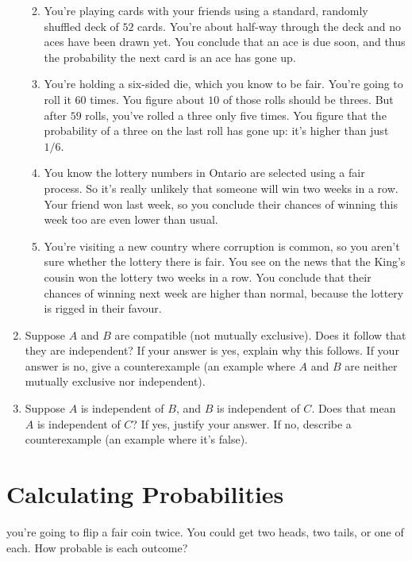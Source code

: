 \documentclass[justified]{tufte-book}
\theoremstyle{definition}
\theoremstyle{definition}
\theoremstyle{definition}
\theoremstyle{definition}
\theoremstyle{remark}
\begin{document}
\begin{enumerate}
  \begin{enumerate}
  \def\labelenumii{\alph{enumii}.}
  \item
    You're playing cards with your friends using a standard, randomly shuffled deck of \(52\) cards. You're about half-way through the deck and no aces have been drawn yet. You conclude that an ace is due soon, and thus the probability the next card is an ace has gone up.
  \item
    You're holding a six-sided die, which you know to be fair. You're going to roll it \(60\) times. You figure about \(10\) of those rolls should be threes. But after \(59\) rolls, you've rolled a three only five times. You figure that the probability of a three on the last roll has gone up: it's higher than just \(1/6\).
  \item
    You know the lottery numbers in Ontario are selected using a fair process. So it's really unlikely that someone will win two weeks in a row. Your friend won last week, so you conclude their chances of winning this week too are even lower than usual.
  \item
    You're visiting a new country where corruption is common, so you aren't sure whether the lottery there is fair. You see on the news that the King's cousin won the lottery two weeks in a row. You conclude that their chances of winning next week are higher than normal, because the lottery is rigged in their favour.
  \end{enumerate}
\item
  Suppose \(A\) and \(B\) are compatible (not mutually exclusive). Does it follow that they are independent? If your answer is yes, explain why this follows. If your answer is no, give a counterexample (an example where \(A\) and \(B\) are neither mutually exclusive nor independent).
\item
  Suppose \(A\) is independent of \(B\), and \(B\) is independent of \(C\). Does that mean \(A\) is independent of \(C\)? If yes, justify your answer. If no, describe a counterexample (an example where it's false).
\end{enumerate}

\hypertarget{calculating-probabilities}{%
\chapter{Calculating Probabilities}\label{calculating-probabilities}}

 you're going to flip a fair coin twice. You could get two heads, two tails, or one of each. How probable is each outcome?
\end{document}
